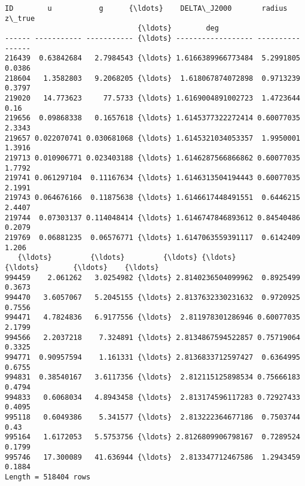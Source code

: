 \documentclass[11pt]{article}
\begin{document}
    \begin{Verbatim}[commandchars=\\\{\}]
  ID        u           g      {\ldots}    DELTA\_J2000       radius   z\_true
                               {\ldots}        deg                          
------ ----------- ----------- {\ldots} ------------------ ---------- ------
216439  0.63842684   2.7984543 {\ldots} 1.6166389966773484  5.2991805 0.0386
218604   1.3582803   9.2068205 {\ldots}  1.618067874072898  0.9713239 0.3797
219020   14.773623     77.5733 {\ldots} 1.6169004891002723  1.4723644   0.16
219656  0.09868338   0.1657618 {\ldots} 1.6145377322272414 0.60077035 2.3343
219657 0.022070741 0.030681068 {\ldots} 1.6145321034053357  1.9950001 1.3916
219713 0.010906771 0.023403188 {\ldots} 1.6146287566866862 0.60077035 1.7792
219741 0.061297104  0.11167634 {\ldots} 1.6146313504194443 0.60077035 2.1991
219743 0.064676166  0.11875638 {\ldots} 1.6146617448491551  0.6446215 2.4407
219744  0.07303137 0.114048414 {\ldots} 1.6146747846893612 0.84540486 0.2079
219769  0.06881235  0.06576771 {\ldots} 1.6147063559391117  0.6142409  1.206
   {\ldots}         {\ldots}         {\ldots} {\ldots}                {\ldots}        {\ldots}    {\ldots}
994459    2.061262   3.0254982 {\ldots} 2.8140236504099962  0.8925499 0.3673
994470   3.6057067   5.2045155 {\ldots} 2.8137632330231632  0.9720925 0.7556
994471   4.7824836   6.9177556 {\ldots}  2.811978301286946 0.60077035 2.1799
994566   2.2037218    7.324891 {\ldots} 2.8134867594522857 0.75719064 0.3325
994771  0.90957594    1.161331 {\ldots} 2.8136833712597427  0.6364995 0.6755
994831  0.38540167   3.6117356 {\ldots}  2.812115125898534 0.75666183 0.4794
994833   0.6068034   4.8943458 {\ldots}  2.813174596117283 0.72927433 0.4095
995118   0.6049386    5.341577 {\ldots}  2.813222364677186  0.7503744   0.43
995164   1.6172053   5.5753756 {\ldots} 2.8126809906798167  0.7289524 0.1799
995746   17.300089   41.636944 {\ldots}  2.813347712467586  1.2943459 0.1884
Length = 518404 rows

    \end{Verbatim}
\end{document}
